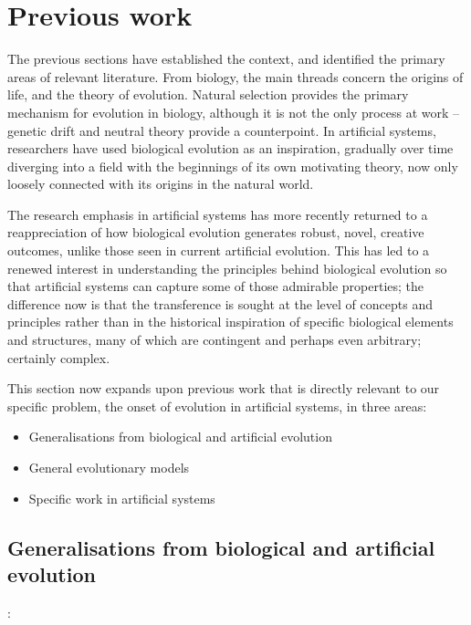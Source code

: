 \chapter{Previous work}

The previous sections have established the context, and identified the primary areas of relevant literature. From biology, the main threads concern the origins of life, and the theory of evolution. Natural selection provides the primary mechanism for evolution in biology, although it is not the only process at work -- genetic drift and neutral theory provide a counterpoint. In artificial systems, researchers have used biological evolution as an inspiration, gradually over time diverging into a field with the beginnings of its own motivating theory, now only loosely connected with its origins in the natural world.

The research emphasis in artificial systems has more recently returned to a reappreciation of how biological evolution generates robust, novel, creative outcomes, unlike those seen in current artificial evolution. This has led to a renewed interest in understanding the principles behind biological evolution so that artificial systems can capture some of those admirable properties; the difference now is that the transference is sought at the level of concepts and principles rather than in the historical inspiration of specific biological elements and structures, many of which are contingent and perhaps even arbitrary; certainly complex.

This section now expands upon previous work that is directly relevant to our specific problem, the onset of evolution in artificial systems, in three areas:

\begin{itemize}
	\item Generalisations from biological and artificial evolution
	\item General evolutionary models
	\item Specific work in artificial systems
\end{itemize}




\section{Generalisations from biological and artificial evolution}

\autocite{Paixao2015}:

